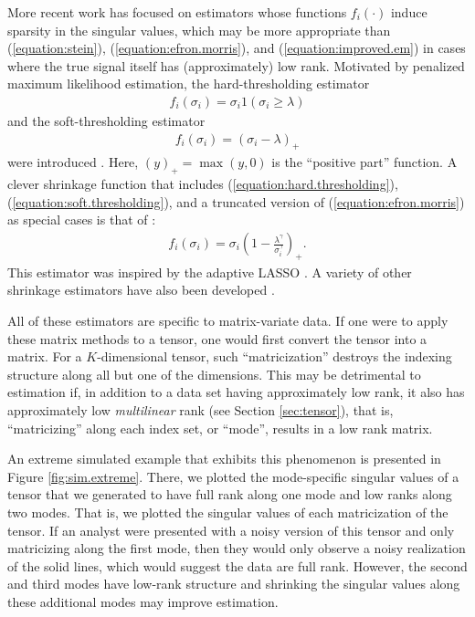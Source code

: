 More recent work has focused on estimators whose functions
$f_i(\cdot)$ induce sparsity in the singular values, which may be more
appropriate than (\ref{equation:stein}),
(\ref{equation:efron.morris}), and (\ref{equation:improved.em}) in
cases where the true signal itself has (approximately) low
rank. Motivated by penalized maximum likelihood estimation, the
hard-thresholding estimator
\begin{align}
  \label{equation:hard.thresholding}
  f_i(\sigma_i) = \sigma_i 1(\sigma_i \geq \lambda)
\end{align}
and the soft-thresholding estimator
\begin{align}
  \label{equation:soft.thresholding}
  f_i(\sigma_i) = (\sigma_i - \lambda)_+
\end{align}
were introduced \citep[for example]{candes2013unbiased}. Here, $(y)_+
= \max(y,0)$ is the ``positive part'' function. A clever shrinkage
function that includes (\ref{equation:hard.thresholding}),
(\ref{equation:soft.thresholding}), and a truncated version of
(\ref{equation:efron.morris}) \citep{verbanck2015regularised} as
special cases is that of \cite{josse2015adaptive}:
\begin{align}
  \label{equation:josse.sardy.est}
  f_i(\sigma_i) = \sigma_i\left(1 - \frac{\lambda^{\gamma}}{\sigma_i^{\gamma}}\right)_+.
\end{align}
This estimator was inspired by the adaptive LASSO
\citep{zou2006adaptive}. A variety of other shrinkage estimators have
also been developed
\citep{nadakuditi2014optshrink,shabalin2013reconstruction}.

All of these estimators are specific to matrix-variate data. If one
were to apply these matrix methods to a tensor, one would first
convert the tensor into a matrix. For a $K$-dimensional tensor, such
``matricization'' destroys the indexing structure along all but one of
the dimensions. This may be detrimental to estimation if, in addition
to a data set having approximately low rank, it also has approximately
low \emph{multilinear} rank (see Section \ref{sec:tensor}), that is,
``matricizing'' along each index set, or ``mode'', results in a low
rank matrix.

An extreme simulated example that exhibits this phenomenon is
presented in Figure \ref{fig:sim.extreme}. There, we plotted the
mode-specific singular values of a tensor that we generated to have
full rank along one mode and low ranks along two modes. That is, we
plotted the singular values of each matricization of the tensor. If an
analyst were presented with a noisy version of this tensor and only
matricizing along the first mode, then they would only observe a noisy
realization of the solid lines, which would suggest the data are full
rank. However, the second and third modes have low-rank structure and
shrinking the singular values along these additional modes may improve
estimation.


